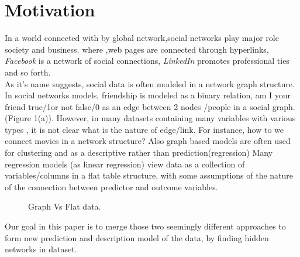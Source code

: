 \documentclass[a4paper]{article}
\begin{document}
\section{Motivation}
In a world connected with by global network,social networks play major role society and business.
where ,web pages are connected through hyperlinks, \emph{Facebook} is a network of social connections, \emph{LinkedIn}  promotes professional ties and so forth.\\
As it's name suggests, social data is often modeled in a network graph structure.
In social networks models, friendship is modeled as a binary relation, am I your friend {true/1}or not {false/0} as an edge between 2 nodes /people in a social graph.(Figure 1(a)).
However, in many datasets containing many variables with various types , it is not clear what is the nature of edge/link.
For instance, how to we connect movies in a network structure?
Also graph based models are often used for clustering 
and as a descriptive rather than prediction(regression)
Many regression models (as linear regression) view data as a collection of variables/columns in a flat table structure, with some assumptions of the nature of the connection between predictor and outcome variables.
\begin{figure}[H]
\centering

 \centering
{}

\caption[Optional caption for list of figures]{
Graph Vs Flat data.
}
\end{figure}
Our goal in this paper is to merge those two seemingly different approaches  to form new prediction and description model of the data, by finding hidden networks in dataset.
\end{document}
